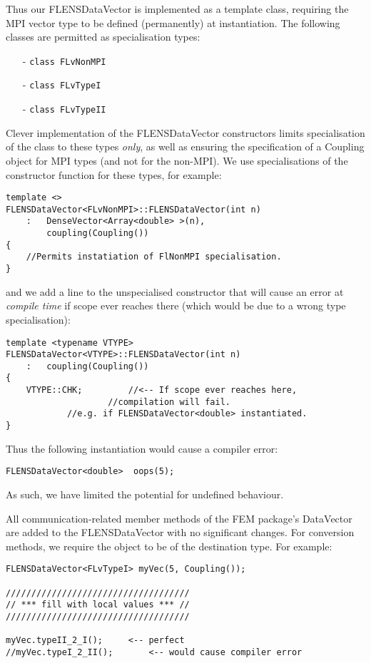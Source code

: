 Thus our FLENSDataVector is implemented as a template class, requiring the MPI vector type to be defined (permanently) at instantiation. The following classes are permitted as specialisation types:
\begin{itemize}
   \item[-] \texttt{class FLvNonMPI}
   \item[-] \texttt{class FLvTypeI}
   \item[-] \texttt{class FLvTypeII}
\end{itemize}

Clever implementation of the FLENSDataVector constructors limits specialisation of the class to these types \emph{only}, as well as ensuring the specification of a Coupling object for MPI types (and not for the non-MPI). We use specialisations of the constructor function for these types, for example:
\begin{lstlisting}
template <>
FLENSDataVector<FLvNonMPI>::FLENSDataVector(int n)
	: 	DenseVector<Array<double> >(n),
		coupling(Coupling())
{
	//Permits instatiation of FlNonMPI specialisation.
}
\end{lstlisting}

and we add a line to the unspecialised constructor that will cause an error at \emph{compile time} if scope ever reaches there (which would be due to a wrong type specialisation):
\begin{lstlisting}
template <typename VTYPE>
FLENSDataVector<VTYPE>::FLENSDataVector(int n)
	:	coupling(Coupling())
{
	VTYPE::CHK;			//<-- If scope ever reaches here,
					//compilation will fail.
			//e.g. if FLENSDataVector<double> instantiated.
}
\end{lstlisting} 

Thus the following instantiation would cause a compiler error:
\begin{lstlisting}
FLENSDataVector<double>  oops(5);
\end{lstlisting}

As such, we have limited the potential for undefined behaviour. 

All communication-related member methods of the FEM package's DataVector are added to the FLENSDataVector with no significant changes. For conversion methods, we require the object to be of the destination type. For example:
\begin{lstlisting}
FLENSDataVector<FLvTypeI> myVec(5, Coupling());

////////////////////////////////////
// *** fill with local values *** //
////////////////////////////////////

myVec.typeII_2_I();		<-- perfect
//myVec.typeI_2_II();		<-- would cause compiler error
\end{lstlisting}

